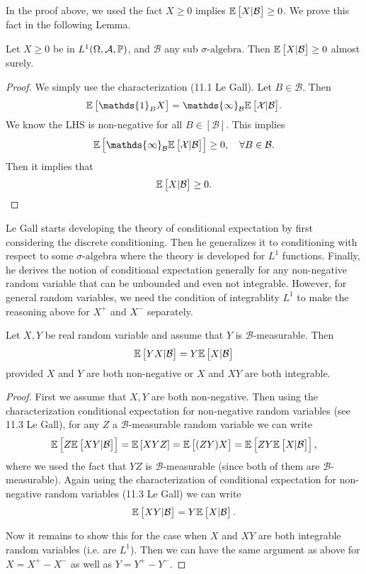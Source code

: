 In the proof above, we used the fact $ X\geq 0 $ implies $ \mathbb{E}\left[X|\mathcal{B}\right]\geq 0 $. We prove this fact in the following Lemma.
\begin{lemma}
	Let $ X\geq 0 $ be in $ L^1(\Omega,\mathcal{A},\mathbb{P}) $, and $ \mathcal{B} $ any sub $\sigma\text{-algebra}$. Then $ \mathbb{E}\left[X|\mathcal{B}\right]  \geq 0 $ almost surely.
\end{lemma}
\begin{proof}
	We simply use the characterization (11.1 Le Gall). Let $ B \in \mathcal{B} $. Then
	\[ \E{\mathds{1}_B X} = \mathcal{\mathds{1}_B \E{X|\mathcal{B}}}. \]
	We know the LHS is non-negative for all $ B\in \mathcal{[B]} $. This implies
	\[ \E{\mathcal{\mathds{1}_B \E{X|\mathcal{B}}}} \geq 0, \quad \forall B \in \mathcal{B}. \]
	Then it implies that
	\[ \mathbb{E}\left[X|\mathcal{B}\right] \geq 0. \]
\end{proof}

\begin{summary}
	Le Gall starts developing the theory of conditional expectation by first considering the discrete conditioning. Then he generalizes it to conditioning with respect to some $\sigma\text{-algebra}$ where the theory is developed for $ L^1 $ functions. Finally, he derives the notion of conditional expectation generally for any non-negative random variable that can be unbounded and even not integrable. However, for general random variables, we need the condition of integrablity $ L^1 $ to make the reasoning above for $ X^+ $ and $ X^- $ separately.
\end{summary}

\begin{proposition}
	Let $ X,Y $ be real random variable and assume that $ Y $ is $ \mathcal{B} $-measurable. Then
	\[ \mathbb{E}\left[YX|\mathcal{B}\right] = Y \mathbb{E}\left[X|\mathcal{B}\right] \]
	provided $ X $ and $ Y $ are both non-negative or $ X $ and $ XY $ are both integrable.
\end{proposition}
\begin{proof}
	First we assume that $ X,Y $ are both non-negative. Then using the characterization conditional expectation for non-negative random variables (see 11.3 Le Gall), for any $ Z $ a $ \mathcal{B} $-measurable random variable we can write
	\[ \mathbb{E}\left[Z \mathbb{E}\left[XY|\mathcal{B}\right]\right] = \mathbb{E}\left[XYZ\right] = \mathbb{E}\left[(ZY) X\right] = \mathbb{E}\left[ZY\mathbb{E}\left[X|\mathcal{B}\right]\right], \]
	where we used the fact that $ YZ $ is $ \mathcal{B} $-measurable (since both of them are $ \mathcal{B} $-measurable). Again using the characterization of conditional expectation for non-negative random variables (11.3 Le Gall) we can write
	\[ \mathbb{E}\left[XY|\mathcal{B}\right] = Y \mathbb{E}\left[X|\mathcal{B}\right]. \]
	
	Now it remains to show this for the case when $ X $  and $ XY $ are both integrable random variables (i.e. are $ L^1 $). Then we can have the same argument as above for $ X = X^+ - X^- $ as well as $ Y = Y^+ - Y^- $. 
\end{proof}



